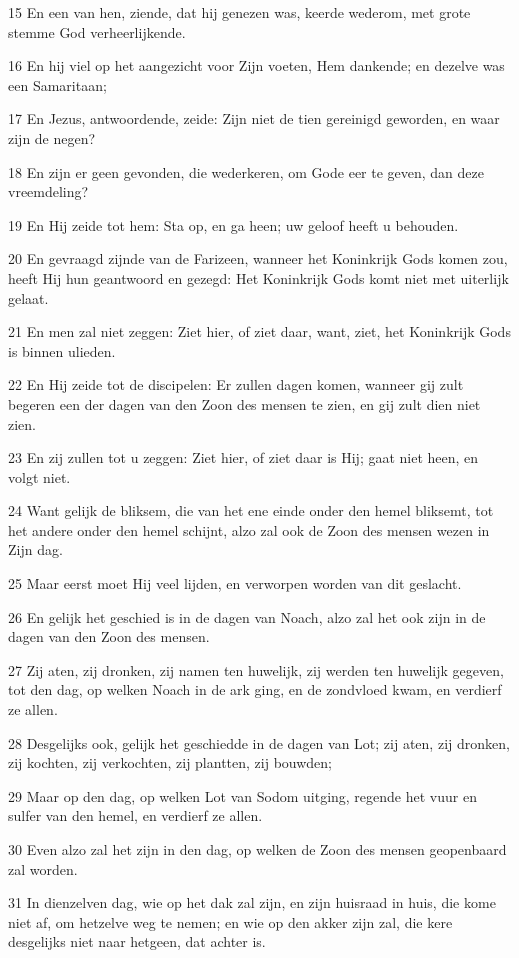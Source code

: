 \par 15 En een van hen, ziende, dat hij genezen was, keerde wederom, met grote stemme God verheerlijkende.
\par 16 En hij viel op het aangezicht voor Zijn voeten, Hem dankende; en dezelve was een Samaritaan;
\par 17 En Jezus, antwoordende, zeide: Zijn niet de tien gereinigd geworden, en waar zijn de negen?
\par 18 En zijn er geen gevonden, die wederkeren, om Gode eer te geven, dan deze vreemdeling?
\par 19 En Hij zeide tot hem: Sta op, en ga heen; uw geloof heeft u behouden.
\par 20 En gevraagd zijnde van de Farizeen, wanneer het Koninkrijk Gods komen zou, heeft Hij hun geantwoord en gezegd: Het Koninkrijk Gods komt niet met uiterlijk gelaat.
\par 21 En men zal niet zeggen: Ziet hier, of ziet daar, want, ziet, het Koninkrijk Gods is binnen ulieden.
\par 22 En Hij zeide tot de discipelen: Er zullen dagen komen, wanneer gij zult begeren een der dagen van den Zoon des mensen te zien, en gij zult dien niet zien.
\par 23 En zij zullen tot u zeggen: Ziet hier, of ziet daar is Hij; gaat niet heen, en volgt niet.
\par 24 Want gelijk de bliksem, die van het ene einde onder den hemel bliksemt, tot het andere onder den hemel schijnt, alzo zal ook de Zoon des mensen wezen in Zijn dag.
\par 25 Maar eerst moet Hij veel lijden, en verworpen worden van dit geslacht.
\par 26 En gelijk het geschied is in de dagen van Noach, alzo zal het ook zijn in de dagen van den Zoon des mensen.
\par 27 Zij aten, zij dronken, zij namen ten huwelijk, zij werden ten huwelijk gegeven, tot den dag, op welken Noach in de ark ging, en de zondvloed kwam, en verdierf ze allen.
\par 28 Desgelijks ook, gelijk het geschiedde in de dagen van Lot; zij aten, zij dronken, zij kochten, zij verkochten, zij plantten, zij bouwden;
\par 29 Maar op den dag, op welken Lot van Sodom uitging, regende het vuur en sulfer van den hemel, en verdierf ze allen.
\par 30 Even alzo zal het zijn in den dag, op welken de Zoon des mensen geopenbaard zal worden.
\par 31 In dienzelven dag, wie op het dak zal zijn, en zijn huisraad in huis, die kome niet af, om hetzelve weg te nemen; en wie op den akker zijn zal, die kere desgelijks niet naar hetgeen, dat achter is.
